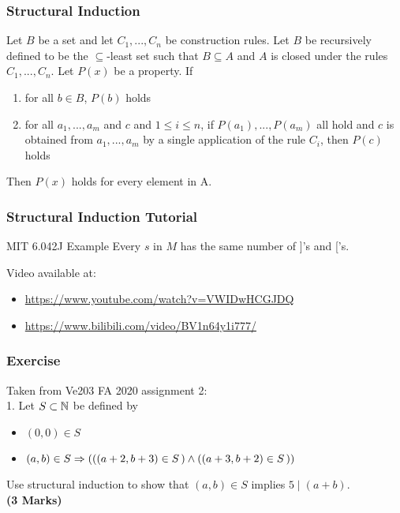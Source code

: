 \documentclass{beamer}
\begin{document}
\begin{frame}
    \frametitle{Structural Induction}
    \hh Let $B$ be a set and let $C_1, ..., C_n$ be construction rules. 
    Let $B$ be recursively defined to be the $\subseteq$-least set such that 
    $B \subseteq A$ and $A$ is closed under the rules $C_1, ..., C_n$. 
    Let $P(x)$ be a property. If
    \begin{enumerate}
        \item for all $b \in B$, $P(b)$ holds
        \item for all $a_1, ..., a_m$ and $c$ and $1\leq i\leq n$, 
        if $P(a_1), ..., P(a_m)$ all hold and $c$ is obtained from 
        $a_1, ..., a_m$ by a single application of the rule $C_i$, 
        then $P(c)$ holds
    \end{enumerate}
    Then $P(x)$ holds for every element in A.
\end{frame}
\begin{frame}
    \frametitle{Structural Induction Tutorial}
    \begin{block}{MIT 6.042J Example}
        \hh 
        Every $s$ in $M$ has the same number of ]'s and ['s.
    \end{block}
    Video available at:
    \begin{itemize}
        \item \url{https://www.youtube.com/watch?v=VWIDwHCGJDQ}
        \item \url{https://www.bilibili.com/video/BV1n64y1i777/}
    \end{itemize}

\end{frame}
\begin{frame}
    \frametitle{Exercise}
    Taken from Ve203 FA 2020 assignment 2: 
    \\ \vs{2em}
    1. Let $S \subset \mathbb{N}$ be defined by
    \begin{itemize}
        \item $(0,0)\in S$
        \item $(a,b)\in S \Rightarrow \left(\left(\left(a+2,b+3\right)\in S\,\right)\wedge \left(\left(a+3,b+2\right)\in S\,\right)\right)$ 
    \end{itemize}
    Use structural induction to show that $(a, b) \in S$ implies $5 \mid (a + b)$.
    \\\textbf{(3 Marks)}
\end{frame}
\end{document}
